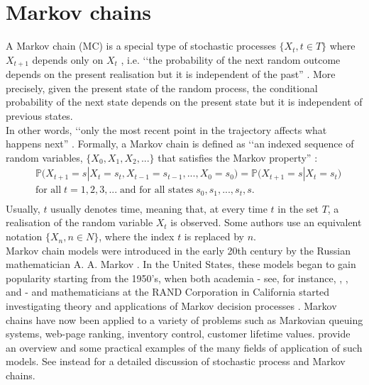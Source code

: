 




\section{Markov chains} \label{markov_chain}
A Markov chain (MC) is a special type of stochastic processes  $  \{ X_t, t \in T\}$ where $X_{t+1}$ depends only on $X_{t}$ , i.e. \lq\lq the probability of the next random outcome depends on the present realisation but it is independent of the past'' \citep{Grinstead1997}. 
More precisely, given the present state of the random process, the conditional probability of the next state depends on the present state but it is independent of previous states.\\
In other words, \lq\lq only the most recent point in the trajectory affects what happens next'' \citep{Holmes2015}. Formally, a Markov chain is defined as \lq\lq an indexed sequence of random variables, $\{X_0, X_1, X_2, ...\}$ that satisfies the Markov property'' \citep{Sheskin2010}:
\begin{equation}
\begin{split}
     & \mathds{P} \big(X_{t+1} = s |X_t = s_t, X_{t-1} = s_{t-1}, . . . , X_0 = s_0\big) = 
     \mathds{P} \big(X_{t+1} = s |X_t = s_t\big)\\
    & \text{for all} \; t = 1, 2, 3, ... \; \text{and for all states} \; s_0, s_1, . . . , s_t, s.\\
\end{split}
\end{equation}
Usually, $t$ usually denotes time, meaning that, at every time $t$ in the set $T$, a realisation of the random variable $X_t$ is observed.
Some authors use an equivalent notation $\{X_n, n \in N\}$, where the index $t$ is replaced by $n$.\\


Markov chain models were introduced in the early 20th century by the Russian mathematician A. A. Markov \citep{Hayes2013}. In the United States, these models began to gain popularity starting from the 1950's, when both academia - see, for instance, \cite{Feller1950}, \cite{Howard1960}, and \cite{Kemeny1960} - and mathematicians at the RAND Corporation in California started investigating theory and applications of Markov decision processes \citep{Sheskin2010}. Markov chains have now been applied to a variety of problems such as Markovian queuing systems, web-page ranking, inventory control, customer lifetime values. \cite{Ching2006} provide an overview and some practical examples of the many fields of application of such models.
See instead \cite{Karlin1975} for a detailed discussion of stochastic process and Markov chains. 



